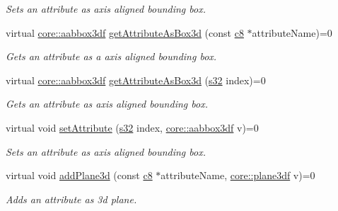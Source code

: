 \begin{DoxyCompactItemize}
\begin{DoxyCompactList}\small\item\em Sets an attribute as axis aligned bounding box. \end{DoxyCompactList}\item 
virtual \hyperlink{namespaceirr_1_1core_adfc8fa01b30044c55f3332a1d6c1aa19}{core\+::aabbox3df} \hyperlink{classirr_1_1io_1_1IAttributes_a215218b9b1ebb8313557b44bb3bce363}{get\+Attribute\+As\+Box3d} (const \hyperlink{namespaceirr_a9395eaea339bcb546b319e9c96bf7410}{c8} $\ast$attribute\+Name)=0
\begin{DoxyCompactList}\small\item\em Gets an attribute as a axis aligned bounding box. \end{DoxyCompactList}\item 
virtual \hyperlink{namespaceirr_1_1core_adfc8fa01b30044c55f3332a1d6c1aa19}{core\+::aabbox3df} \hyperlink{classirr_1_1io_1_1IAttributes_a3da2aafbf1bfe8bcdb7dfa2866a4efe4}{get\+Attribute\+As\+Box3d} (\hyperlink{namespaceirr_ac66849b7a6ed16e30ebede579f9b47c6}{s32} index)=0
\begin{DoxyCompactList}\small\item\em Gets an attribute as axis aligned bounding box. \end{DoxyCompactList}\item 
\mbox{\label{classirr_1_1io_1_1IAttributes_a5384d725e45fa4b8916ecbf64d07b3be}} 
virtual void \hyperlink{classirr_1_1io_1_1IAttributes_a5384d725e45fa4b8916ecbf64d07b3be}{set\+Attribute} (\hyperlink{namespaceirr_ac66849b7a6ed16e30ebede579f9b47c6}{s32} index, \hyperlink{namespaceirr_1_1core_adfc8fa01b30044c55f3332a1d6c1aa19}{core\+::aabbox3df} v)=0
\begin{DoxyCompactList}\small\item\em Sets an attribute as axis aligned bounding box. \end{DoxyCompactList}\item 
\mbox{\label{classirr_1_1io_1_1IAttributes_a567d22135378c1da552f480e0ca90d43}} 
virtual void \hyperlink{classirr_1_1io_1_1IAttributes_a567d22135378c1da552f480e0ca90d43}{add\+Plane3d} (const \hyperlink{namespaceirr_a9395eaea339bcb546b319e9c96bf7410}{c8} $\ast$attribute\+Name, \hyperlink{namespaceirr_1_1core_ae7491b7985dcb74b840bfcd9c054b232}{core\+::plane3df} v)=0
\begin{DoxyCompactList}\small\item\em Adds an attribute as 3d plane. \end{DoxyCompactList}\item 

\end{DoxyCompactItemize}
